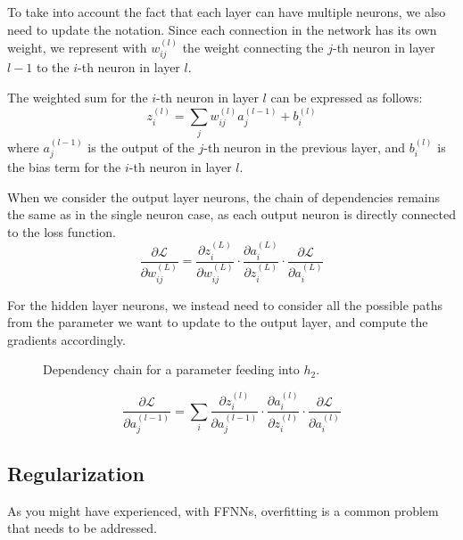 To take into account the fact that each layer can have multiple neurons, we also need to update the notation. Since each connection in the network has its own weight,
we represent with $w_{ij}^{(l)}$ the weight connecting the $j$-th neuron in layer $l-1$ to the $i$-th neuron in layer $l$.

The weighted sum for the $i$-th neuron in layer $l$ can be expressed as follows:
\begin{equation*}
    z_i^{(l)} = \sum_{j} w_{ij}^{(l)} a_j^{(l-1)} + b_i^{(l)}
\end{equation*}
where $a_j^{(l-1)}$ is the output of the $j$-th neuron in the previous layer, and $b_i^{(l)}$ is the bias term for the $i$-th neuron in layer $l$.

When we consider the output layer neurons, the chain of dependencies remains the same as in the single neuron case, as each output neuron is directly connected to the loss function.
\begin{equation*}
    \frac{\partial \mathcal{L}}{\partial w_{ij}^{(L)}} = \frac{\partial z_i^{(L)}}{\partial w_{ij}^{(L)}} \cdot \frac{\partial a_i^{(L)}}{\partial z_i^{(L)}} \cdot \frac{\partial \mathcal{L}}{\partial a_i^{(L)}}
\end{equation*}

For the hidden layer neurons, we instead need to consider all the possible paths from the parameter we want to update to the output layer, and compute the gradients accordingly.
\begin{figure}[H]
    \centering
    \scalebox{0.5}{}
    \caption{Dependency chain for a parameter feeding into $h_2$.}
    \label{fig:backpropagation_output}
\end{figure}
\begin{equation*}
    \frac{\partial \mathcal{L}}{\partial a_j^{(l-1)}} = \sum_{i} \frac{\partial z_i^{(l)}}{\partial a_j^{(l-1)}} \cdot \frac{\partial a_i^{(l)}}{\partial z_i^{(l)}} \cdot \frac{\partial \mathcal{L}}{\partial a_i^{(l)}}
\end{equation*}

\subsection{Regularization}
As you might have experienced, with FFNNs, overfitting is a common problem that needs to be addressed. 

